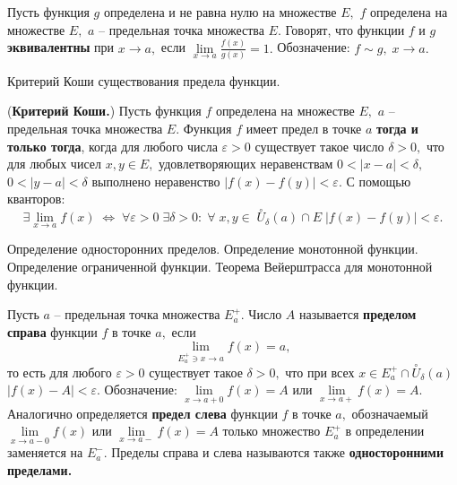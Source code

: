 \begin{definition}
	Пусть функция $g$ определена и не равна нулю
	на множестве $E,$
	$f$ определена на множестве
	$E,$ $a$ -- предельная точка множества
	$E.$ Говорят, что функции $f$ и $g$
	\textbf{эквивалентны} при $x\rightarrow a,$
	если $\lim\limits_{x\rightarrow a}
		\frac{f(x)}{g(x)}=1.$ Обозначение:
	$f\sim g,\;x\rightarrow a.$
\end{definition}
\newpage
\begin{problem}
Критерий Коши существования предела функции.
\end{problem}

\begin{theorem} (\textbf{Критерий Коши.})
	Пусть функция $f$ определена на множестве $E,$
	$a$ -- предельная точка множества $E.$
	Функция $f$ имеет предел в точке $a$
	\textbf{тогда и только тогда}, когда для любого
	числа $\varepsilon>0$ существует такое число
	$\delta>0,$ что для любых чисел $x, y \in E,$
	удовлетворяющих неравенствам $0<|x-a|<\delta,$
	$0<|y-a|<\delta$ выполнено неравенство $|f(x)-
		f(y)|<\varepsilon.$ С помощью кванторов:
	$$\exists \lim\limits_{x\rightarrow a}f(x)\;
		\Leftrightarrow\;\forall \varepsilon > 0\;
		\exists \delta >0 :\;\forall \;x, y \in\;
		\stackrel{\circ}{U}_{\delta}(a) \cap E\;
		|f(x) - f(y)| < \varepsilon.
	$$
\end{theorem}

\newpage
\begin{problem}
Определение односторонних пределов. Определение монотонной функции. Определение ограниченной функции. Теорема Вейерштрасса для монотонной функции.
\end{problem}

\begin{definition}
	Пусть $a$ -- предельная точка множества $E^+_a.$
	Число $A$ называется \textbf{пределом справа}
	функции $f$ в точке $a,$ если
	$$
		\lim\limits_{E^+_a\ni x\to a}f(x)=a,
	$$
	то есть для любого
	$\varepsilon>0$ существует такое $\delta>0,$
	что при всех $x \in
		E^+_a\cap\stackrel{\circ}{U}_{\delta}(a)$
	$|f(x)-A|<\varepsilon.$
	Обозначение: $\lim\limits_{x\rightarrow a+0}f(x)=A$
	или $\lim\limits_{x\rightarrow a+}f(x)=A.$
	Аналогично определяется \textbf{предел слева} функции
	$f$ в точке $a,$ обозначаемый
	$\lim\limits_{x\rightarrow a-0}f(x)$
	или $\lim\limits_{x\rightarrow a-}f(x)=A$
	только множество $E^+_a$ в
	определении заменяется на $E^-_a.$
	Пределы справа и слева называются также
	\textbf{односторонними пределами.}
\end{definition}

